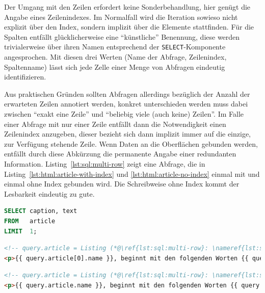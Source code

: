 Der Umgang mit den Zeilen erfordert keine Sonderbehandlung, hier genügt die Angabe eines Zeilenindexes. Im Normalfall wird die Iteration sowieso nicht explizit über den Index, sondern implizit über die Elemente stattfinden. Für die Spalten entfällt glücklicherweise eine "`künstliche"' Benennung, diese werden trivialerweise über ihren Namen entsprechend der \texttt{SELECT}-Komponente angesprochen. Mit diesen drei Werten (Name der Abfrage, Zeilenindex, Spaltenname) lässt sich jede Zelle einer Menge von Abfragen eindeutig identifizieren.

Aus praktischen Gründen sollten Abfragen allerdings bezüglich der Anzahl der erwarteten Zeilen annotiert werden, konkret unterschieden werden muss dabei zwischen "`exakt eine Zeile"' und "`beliebig viele (auch keine) Zeilen"'. Im Falle einer Abfrage mit nur einer Zeile entfällt dann die Notwendigkeit einen Zeilenindex anzugeben, dieser bezieht sich dann implizit immer auf die einzige, zur Verfügung stehende Zeile. Wenn Daten an die Oberflächen gebunden werden, entfällt durch diese Abkürzung die permanente Angabe einer redundanten Information. Listing~\ref{lst:sql:multi-row} zeigt eine Abfrage, die in Listing~\ref{lst:html:article-with-index} und \ref{lst:html:article-no-index} einmal mit und einmal ohne Index gebunden wird. Die Schreibweise ohne Index kommt der Lesbarkeit eindeutig zu gute.

\begin{lstlisting}[float=h, language=SQL, caption=Abfrage mit maximal einer Ergebniszeile,label=lst:sql:multi-row]
SELECT caption, text
FROM   article
LIMIT  1;
\end{lstlisting}

\begin{lstlisting}[float=h, language=HTML, caption=String-Interpolation mit Indexzugriff, label=lst:html:article-with-index]
<!-- query.article = Listing (*@\ref{lst:sql:multi-row}: \nameref{lst:sql:multi-row}@*) -->
<p>{{ query.article[0].name }}, beginnt mit den folgenden Worten {{ query.article[0].text | truncatewords: 4 }}.</p>
\end{lstlisting}

\begin{lstlisting}[float=h, language=HTML, caption=String-Interpolation mit implizitem Index, label=lst:html:article-no-index]
<!-- query.article = Listing (*@\ref{lst:sql:multi-row}: \nameref{lst:sql:multi-row}@*) -->
<p>{{ query.article.name }}, beginnt mit den folgenden Worten {{ query.article.text | truncatewords: 4 }}.</p>
\end{lstlisting}

